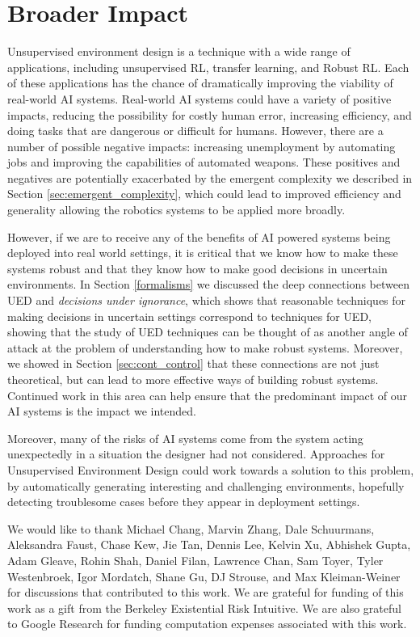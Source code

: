 \documentclass{article}
\begin{document}
\section*{Broader Impact}
Unsupervised environment design is a technique with a wide range of applications, including unsupervised RL, transfer learning, and Robust RL.  Each of these applications has the chance of dramatically improving the viability of real-world AI systems.  Real-world AI systems could have a variety of positive impacts, reducing the possibility for costly human error, increasing efficiency, and doing tasks that are dangerous or difficult for humans.  However, there are a number of possible negative impacts: increasing unemployment by automating jobs \citep{frey2017future} 
and improving the capabilities of automated weapons.  These positives and negatives are potentially exacerbated by the emergent complexity we described in Section \ref{sec:emergent_complexity}, which could lead to improved efficiency and generality allowing the robotics systems to be applied more broadly.

However, if we are to receive any of the benefits of AI powered systems being deployed into real world settings, it is critical that we know how to make these systems robust and that they know how to make good decisions in uncertain environments.  In Section \ref{formalisms} we discussed the deep connections between UED and \emph{decisions under ignorance}, which shows that reasonable techniques for making decisions in uncertain settings correspond to techniques for UED, showing that the study of UED techniques can be thought of as another angle of attack at the problem of understanding how to make robust systems.  Moreover, we showed in Section \ref{sec:cont_control} that these connections are not just theoretical, but can lead to more effective ways of building robust systems.  Continued work in this area can help ensure that the predominant impact of our AI systems is the impact we intended.

Moreover, many of the risks of AI systems come from the system acting unexpectedly in a situation the designer had not considered.  Approaches for Unsupervised Environment Design could work towards a solution to this problem, by automatically generating interesting and challenging environments, hopefully detecting troublesome cases before they appear in deployment settings.

\begin{ack}
We would like to thank Michael Chang, Marvin Zhang, Dale Schuurmans, Aleksandra Faust, Chase Kew, Jie Tan, Dennis Lee, Kelvin Xu, Abhishek Gupta, Adam Gleave, Rohin Shah, Daniel Filan, Lawrence Chan, Sam Toyer, Tyler Westenbroek, Igor Mordatch, Shane Gu, DJ Strouse, and Max Kleiman-Weiner for discussions that contributed to this work. We are grateful for funding of this work as a gift from the Berkeley Existential Risk Intuitive.
We are also grateful to Google Research for funding computation expenses associated with this work.  
\end{ack}
\end{document}
